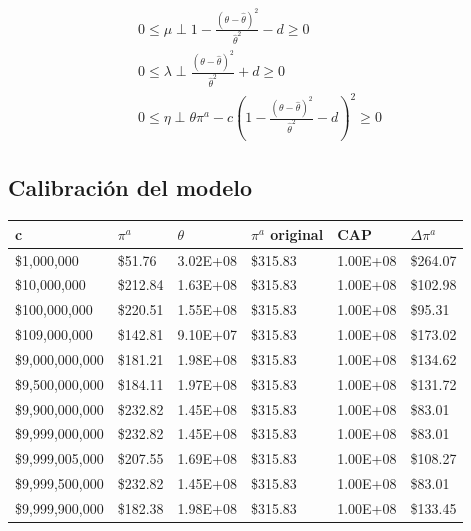 \begin{footnotesize}
\begin{align}
    0 \leq \mu \perp 1 - \frac{(\theta-\hat{\theta})^2}{\hat{\theta}^2} - d  \geq 0\\
    0 \leq \lambda \perp \frac{(\theta-\hat{\theta})^2}{\hat{\theta}^2 }+ d \geq 0 \\
    0 \leq \eta \perp \theta \pi^a - c(1-\frac{(\theta - \hat{\theta})^2}{\hat{\theta}^2}-d)^2 \geq 0
\end{align}
\end{footnotesize}

\subsection{Calibración del modelo}

\begin{table}[H]
    \centering
    \begin{tabular}{|l|l|l|l|l|l|}
    \hline
        c & $\pi^a$ & $\theta$ & $\pi^a$ original &  CAP& $\Delta \pi^a$    \\ \hline
         \$1,000,000  &  \$51.76  & 3.02E+08 &  \$315.83  & 1.00E+08 &  \$264.07   \\ \hline
         \$10,000,000  &  \$212.84  & 1.63E+08 &  \$315.83  & 1.00E+08 &  \$102.98   \\ \hline
         \$100,000,000  &  \$220.51  & 1.55E+08 &  \$315.83  & 1.00E+08 &  \$95.31   \\ \hline
         \$109,000,000  &  \$142.81  & 9.10E+07 &  \$315.83  & 1.00E+08 &  \$173.02   \\ \hline
         \$9,000,000,000  &  \$181.21  & 1.98E+08 &  \$315.83  & 1.00E+08 &  \$134.62   \\ \hline
         \$9,500,000,000  &  \$184.11  & 1.97E+08 &  \$315.83  & 1.00E+08 &  \$131.72   \\ \hline
         \$9,900,000,000  &  \$232.82  & 1.45E+08 &  \$315.83  & 1.00E+08 &  \$83.01   \\ \hline
         \$9,999,000,000  &  \$232.82  & 1.45E+08 &  \$315.83  & 1.00E+08 &  \$83.01   \\ \hline
         \$9,999,005,000  &  \$207.55  & 1.69E+08 &  \$315.83  & 1.00E+08 &  \$108.27   \\ \hline
         \$9,999,500,000  &  \$232.82  & 1.45E+08 &  \$315.83  & 1.00E+08 &  \$83.01   \\ \hline
         \$9,999,900,000  &  \$182.38  & 1.98E+08 &  \$315.83  & 1.00E+08 &  \$133.45   \\ \hline

\end{tabular}
\end{table}
